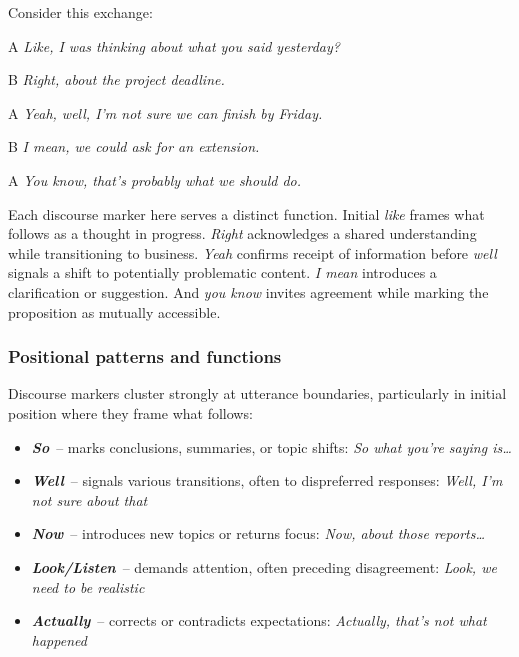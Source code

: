 Consider this exchange:

\begin{dialogue}
\item[A] \textit{Like, I was thinking about what you said yesterday?}
\item[B] \textit{Right, about the project deadline.}
\item[A] \textit{Yeah, well, I'm not sure we can finish by Friday.}
\item[B] \textit{I mean, we could ask for an extension.}
\item[A] \textit{You know, that's probably what we should do.}
\end{dialogue}

Each discourse marker here serves a distinct function. Initial \textit{like} frames what follows as a thought in progress. \textit{Right} acknowledges a shared understanding while transitioning to business. \textit{Yeah} confirms receipt of information before \textit{well} signals a shift to potentially problematic content. \textit{I mean} introduces a clarification or suggestion. And \textit{you know} invites agreement while marking the proposition as mutually accessible.

\subsubsection*{Positional patterns and functions}

Discourse markers cluster strongly at utterance boundaries, particularly in initial position where they frame what follows:

\begin{itemize}[noitemsep]
   \item \textbf{\textit{So}}~-- marks conclusions, summaries, or topic shifts: \textit{So what you're saying is\dots}
   \item \textbf{\textit{Well}}~-- signals various transitions, often to dispreferred responses: \textit{Well, I'm not sure about that}
   \item \textbf{\textit{Now}}~-- introduces new topics or returns focus: \textit{Now, about those reports\dots}
   \item \textbf{\textit{Look/Listen}}~-- demands attention, often preceding disagreement: \textit{Look, we need to be realistic}
   \item \textbf{\textit{Actually}}~-- corrects or contradicts expectations: \textit{Actually, that's not what happened}
\end{itemize}

